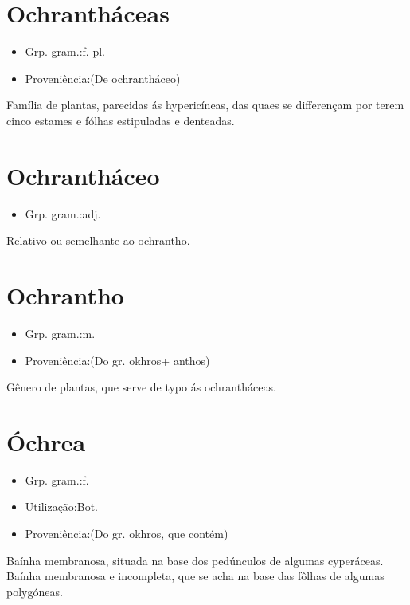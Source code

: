 \section{Ochrantháceas}
\begin{itemize}
\item {Grp. gram.:f. pl.}
\end{itemize}
\begin{itemize}
\item {Proveniência:(De \textunderscore ochrantháceo\textunderscore )}
\end{itemize}
Família de plantas, parecidas ás hypericíneas, das quaes se differençam por terem cinco estames e fólhas estipuladas e denteadas.
\section{Ochrantháceo}
\begin{itemize}
\item {Grp. gram.:adj.}
\end{itemize}
Relativo ou semelhante ao ochrantho.
\section{Ochrantho}
\begin{itemize}
\item {Grp. gram.:m.}
\end{itemize}
\begin{itemize}
\item {Proveniência:(Do gr. \textunderscore okhros\textunderscore  + \textunderscore anthos\textunderscore )}
\end{itemize}
Gênero de plantas, que serve de typo ás ochrantháceas.
\section{Óchrea}
\begin{itemize}
\item {Grp. gram.:f.}
\end{itemize}
\begin{itemize}
\item {Utilização:Bot.}
\end{itemize}
\begin{itemize}
\item {Proveniência:(Do gr. \textunderscore okhros\textunderscore , que contém)}
\end{itemize}
Baínha membranosa, situada na base dos pedúnculos de algumas cyperáceas.
Baínha membranosa e incompleta, que se acha na base das fôlhas de algumas polygóneas.
